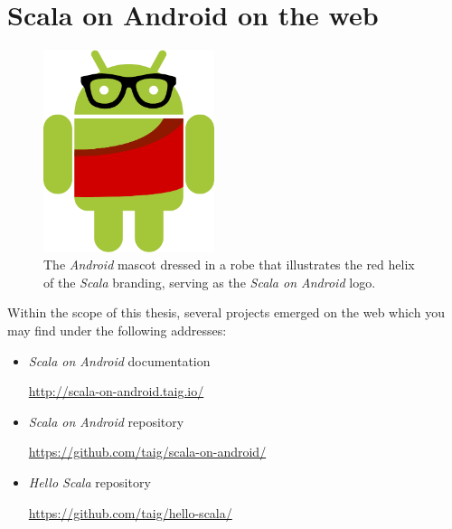 \section{Scala on Android on the web}

\begin{figure}
	\centering
		\includegraphics[width=5cm]{asset/logo.pdf}
		\caption{The \textit{Android} mascot dressed in a robe that illustrates the red helix of the \textit{Scala} branding, serving as the \textit{Scala on Android} logo.}
\end{figure}

Within the scope of this thesis, several projects emerged on the web which you may find under the following addresses:

\begin{itemize}

	\item \textit{Scala on Android} documentation

	\url{http://scala-on-android.taig.io/}

	\item \textit{Scala on Android} repository

	\url{https://github.com/taig/scala-on-android/}

	\item \textit{Hello Scala} repository

	\url{https://github.com/taig/hello-scala/}

\end{itemize}